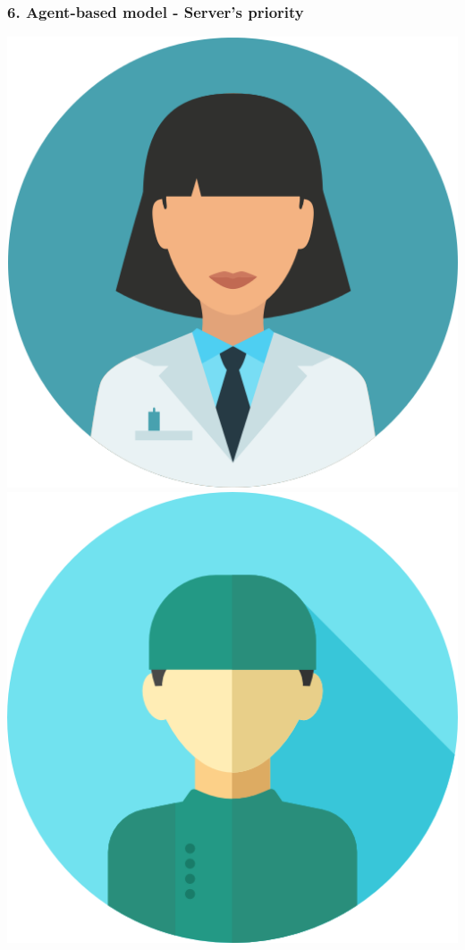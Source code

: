 \begin{frame}
    \frametitle{6. Agent-based model - Server's priority}
    \centering

    \includegraphics[scale=0.08]{Bin/staff_avatars/doctor_1.png}
    \hspace{0.4cm}
    \includegraphics[scale=0.1]{Bin/staff_avatars/doctor_2.png}

\end{frame}
